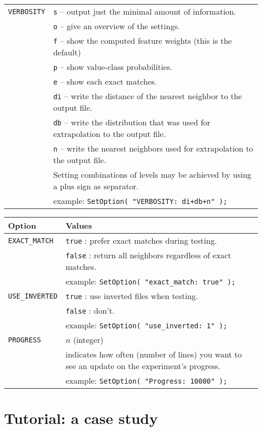 \documentclass{report}
\begin{document}
\begin{tabular}{|l|p{12cm}|}
\hline
{\tt VERBOSITY}	  & {\tt s} -- output just the minimal amount of information.\\
		  & {\tt o} -- give an overview of the settings.\\
		  & {\tt f} -- show the computed feature weights (this is the
default)\\
		  & {\tt p} -- show value-class probabilities.\\
		  & {\tt e} -- show each exact matches.\\
		  & {\tt di} -- write the distance of the nearest neighbor to the output file.\\
		  & {\tt db} -- write the distribution that was used for extrapolation to the output file.\\
		  & {\tt n} -- write the nearest neighbors used for extrapolation to the output file.\\
		  & Setting combinations of levels may be achieved by using a plus sign as separator.\\
		  & example: {\tt SetOption( "VERBOSITY: di+db+n" );}\\
\hline
\end{tabular}

\begin{tabular}{|l|p{12cm}|}
\hline
Option & Values\\
\hline
{\tt EXACT\_MATCH} & {\tt true} : prefer exact matches during testing.\\
		  & {\tt false} : return all neighbors regardless of exact matches.\\
		  & example: {\tt SetOption( "exact\_match: true" );}\\
\hline
{\tt USE\_INVERTED}& {\tt true} : use inverted files when testing.\\
		  & {\tt false} : don't.\\
		  & example: {\tt SetOption(  "use\_inverted: 1" );}\\
\hline
{\tt PROGRESS}    & $n$ (integer)\\
		  & indicates how often (number of lines) you want to 
		    see an update on the experiment's progress.\\
		  & example: {\tt SetOption( "Progress: 10000" );}\\
\hline
\end{tabular}




\appendix

\chapter{Tutorial: a case study}
\label{tutorial}
\end{document}

